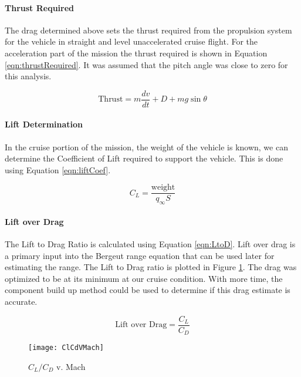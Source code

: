 \paragraph{Thrust Required}
The drag determined above sets the thrust required from the propulsion system for the vehicle in straight and level unaccelerated cruise flight.
For the acceleration part of the mission the thrust required is shown in Equation \ref{eqn:thrustRequired}. It was assumed that the pitch angle was close to zero for this analysis.

\begin{equation}
\label{eqn:thrustRequired}
\text{Thrust}=m\frac{dv}{dt}+D+mg\sin{\theta}
\end{equation}

\paragraph{Lift Determination}
In the cruise portion of the mission, the weight of the vehicle is known, we can determine the Coefficient of Lift required to support the vehicle. This is done using Equation \ref{eqn:liftCoef}.

\begin{equation}
\label{eqn:liftCoef}
C_L=\frac{\text{weight}}{q_{\infty}S}
\end{equation}

\paragraph{Lift over Drag}
The Lift to Drag Ratio is calculated using Equation \ref{eqn:LtoD}. Lift over drag is a primary input into the Bergeut range equation that can be used later for estimating the range. The Lift to Drag ratio is plotted in Figure \ref{fig:ClCdVMach}. The drag was optimized to be at its minimum at our cruise condition. With more time, the component build up method could be used to determine if this drag estimate is accurate.

\begin{equation}
\label{eqn:LtoD}
\text{Lift over Drag} = \frac{C_L}{C_D}
\end{equation}

\begin{figure}[H]
\begin{center}
\texttt{[image: ClCdVMach]}
\caption{$C_L/C_D$ v. Mach}
\label{fig:ClCdVMach}
\end{center}
\end{figure}